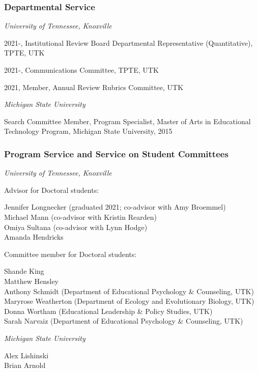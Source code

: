 \documentclass[
  14,
]{article}
\begin{document}
\hypertarget{departmental-service}{%
\subsubsection{Departmental Service}\label{departmental-service}}

\emph{University of Tennessee, Knoxville}

2021-, Institutional Review Board Departmental Representative
(Quantitative), TPTE, UTK

2021-, Communications Committee, TPTE, UTK

2021, Member, Annual Review Rubrics Committee, UTK

\emph{Michigan State University}

Search Committee Member, Program Specialist, Master of Arts in
Educational Technology Program, Michigan State University, 2015

\hypertarget{program-service-and-service-on-student-committees}{%
\subsubsection{Program Service and Service on Student
Committees}\label{program-service-and-service-on-student-committees}}

\emph{University of Tennessee, Knoxville}

Advisor for Doctoral students:

Jennifer Longnecker (graduated 2021; co-advisor with Amy Broemmel)\\
Michael Mann (co-advisor with Kristin Rearden)\\
Omiya Sultana (co-advisor with Lynn Hodge)\\
Amanda Hendricks

Committee member for Doctoral students:

Shande King\\
Matthew Hensley\\
Anthony Schmidt (Department of Educational Psychology \& Counseling,
UTK)\\
Maryrose Weatherton (Department of Ecology and Evolutionary Biology,
UTK)\\
Donna Wortham (Educational Leadership \& Policy Studies, UTK)\\
Sarah Narvaiz (Department of Educational Psychology \& Counseling, UTK)

\emph{Michigan State University}

Alex Lishinski\\
Brian Arnold
\end{document}
